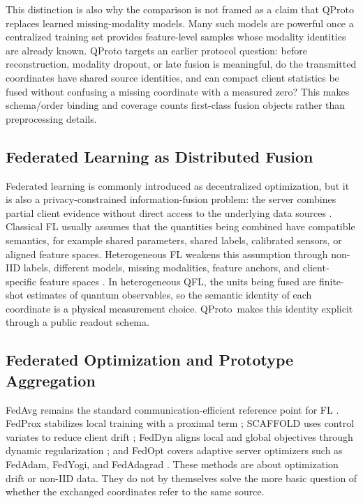 \documentclass[preprint]{elsarticle}
\newcommand{\method}{QProto}
\begin{document}
This distinction is also why the comparison is not framed as a claim that QProto replaces learned missing-modality models. Many such models are powerful once a centralized training set provides feature-level samples whose modality identities are already known. QProto targets an earlier protocol question: before reconstruction, modality dropout, or late fusion is meaningful, do the transmitted coordinates have shared source identities, and can compact client statistics be fused without confusing a missing coordinate with a measured zero? This makes schema/order binding and coverage counts first-class fusion objects rather than preprocessing details.

\subsection{Federated Learning as Distributed Fusion}

Federated learning is commonly introduced as decentralized optimization, but it is also a privacy-constrained information-fusion problem: the server combines partial client evidence without direct access to the underlying data sources \cite{yang2019federated,kairouz2021advances}. Classical FL usually assumes that the quantities being combined have compatible semantics, for example shared parameters, shared labels, calibrated sensors, or aligned feature spaces. Heterogeneous FL weakens this assumption through non-IID labels, different models, missing modalities, feature anchors, and client-specific feature spaces \cite{li2020fedprox,karimireddy2020scaffold,acar2021feddyn,reddi2021fedopt,rakotomamonjy2024flic,zhou2024fedfa}. In heterogeneous QFL, the units being fused are finite-shot estimates of quantum observables, so the semantic identity of each coordinate is a physical measurement choice. \method\ makes this identity explicit through a public readout schema.

\subsection{Federated Optimization and Prototype Aggregation}

FedAvg remains the standard communication-efficient reference point for FL \cite{mcmahan2017fedavg}. FedProx stabilizes local training with a proximal term \cite{li2020fedprox}; SCAFFOLD uses control variates to reduce client drift \cite{karimireddy2020scaffold}; FedDyn aligns local and global objectives through dynamic regularization \cite{acar2021feddyn}; and FedOpt covers adaptive server optimizers such as FedAdam, FedYogi, and FedAdagrad \cite{reddi2021fedopt}. These methods are about optimization drift or non-IID data. They do not by themselves solve the more basic question of whether the exchanged coordinates refer to the same source.
\end{document}
